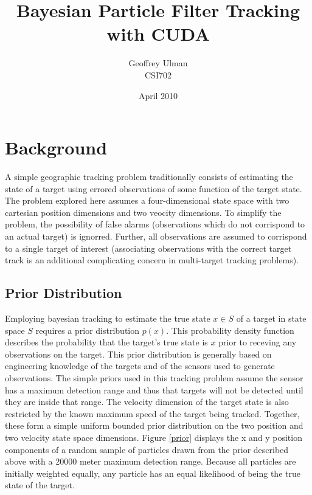 \documentclass{article}
\begin{document}
\title{Bayesian Particle Filter Tracking with CUDA}
\author{Geoffrey Ulman\\
        CSI702}
\date{April 2010}
\maketitle

\tableofcontents

\section{Background}
A simple geographic tracking problem traditionally consists of estimating the state of a target using errored observations of some function of the target state. The problem explored here assumes a four-dimensional state space with two cartesian position dimensions and two veocity dimensions. To simplify the problem, the possibility of false alarms (observations which do not corrispond to an actual target) is ignorred. Further, all observations are assumed to corrispond to a single target of interest (associating observations with the correct target track is an additional complicating concern in multi-target tracking problems).

\subsection{Prior Distribution}
Employing bayesian tracking to estimate the true state \(x \in S\) of a target in state space \(S\) requires a prior distribution \(p(x)\). This probability density function describes the probability that the target's true state is \(x\) prior to receving any observations on the target. This prior distribution is generally based on engineering knowledge of the targets and of the sensors used to generate observations. The simple priors used in this tracking problem assume the sensor has a maximum detection range and thus that targets will not be detected until they are inside that range. The velocity dimension of the target state is also restricted by the known maximum speed of the target being tracked. Together, these form a simple uniform bounded prior distribution on the two position and two velocity state space dimensions. Figure \ref{prior} displays the x and y position components of a random sample of particles drawn from the prior described above with a 20000 meter maximum detection range. Because all particles are initially weighted equally, any particle has an equal likelihood of being the true state of the target.
\end{document}
